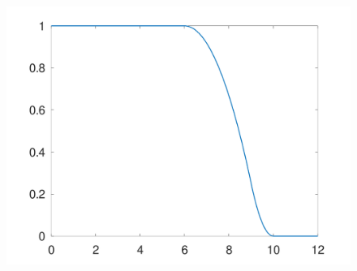 \documentclass{article}
\begin{document}
\begin{figure}[!htbp]
{\begin{minipage}[b]{.23\linewidth}
      \includegraphics[scale=0.1]{figures/Assignment_G_N2_2_1.png}
      \end{minipage}
    }
    \newline
\end{figure}
\end{document}
